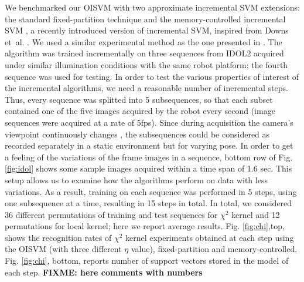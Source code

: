 We benchmarked our OISVM with two approximate incremental SVM extensions:
the standard fixed-partition technique \cite{ijcai99} and the memory-controlled incremental
SVM \cite{luo:icra07}, a recently introduced version of incremental SVM, 
 inspired from Downs et~al. \cite{DownsGM01}. We used a similar experimental
method as the one presented in \cite{luo:icra07}. The algorithm was trained incrementally on
three sequences from IDOL2 acquired under similar illumination conditions with the same robot
platform; the fourth sequence was used for testing. In order to test the various properties of
interest of the incremental algorithms, we need a reasonable number of incremental steps.
Thus, every sequence was splitted into 5 subsequences, so that each subset contained one of the
five images acquired by the robot every second (image sequences were acquired at a rate of
5fps). Since during acquisition the camera's viewpoint continuously changes \cite{luo:icra07},
the subsequences could be considered as recorded separately in a static environment but for
varying pose. In order to get a feeling of the variations of the frame images in a sequence,
bottom row of Fig. \ref{fig:idol} shows some sample images acquired within a time span of 1.6 sec.
This setup allows us to examine how the algorithms perform on data with less
variations. As a result, training on each sequence was performed in 5 steps, using one subsequence
at a time, resulting in 15 steps in total. In total, we considered 36 different permutations
of training and test sequences for $\chi^2$ kernel and 12 permutations for local kernel; here
we report average results. Fig. \ref{fig:chi},top, shows the recognition rates of $\chi^2$ kernel experiments
obtained at each step using the OISVM (with three different $\eta$ value), fixed-partition and
memory-controlled. Fig. \ref{fig:chi}, bottom, reports number of support vectors stored in the model of
each step. \textbf{FIXME: here comments with numbers}

